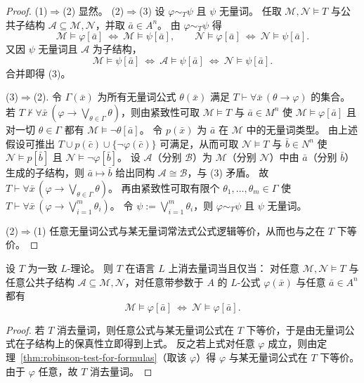 \documentclass[lang=cn,a4paper,newtx,section]{elegantbook}
\begin{document}
\begin{proof}
(1)$\Rightarrow$(2) 显然。
(2)$\Rightarrow$(3) 设 $\varphi\sim_T\psi$ 且 $\psi$ 无量词。
任取 $\mathcal M,\mathcal N\models T$ 与公共子结构 $\mathcal A\subseteq\mathcal M,\mathcal N$，并取 $\bar a\in A^n$。
由 $\varphi\sim_T\psi$ 得
\[
  \mathcal M\models\varphi[\bar a]\ \Longleftrightarrow\ \mathcal M\models\psi[\bar a],
  \qquad
  \mathcal N\models\varphi[\bar a]\ \Longleftrightarrow\ \mathcal N\models\psi[\bar a].
\]
又因 $\psi$ 无量词且 $\mathcal A$ 为子结构，
\[
  \mathcal M\models\psi[\bar a]\ \Longleftrightarrow\ \mathcal A\models\psi[\bar a]\ \Longleftrightarrow\ \mathcal N\models\psi[\bar a].
\]
合并即得 (3)。

(3)$\Rightarrow$(2).
令 $\Gamma(\bar x)$ 为所有无量词公式 $\theta(\bar x)$ 满足 $T\vdash\forall\bar x\,(\theta\to\varphi)$ 的集合。
若 $T\not\vdash\forall\bar x\,(\varphi\to\bigvee_{\theta\in\Gamma}\theta)$，则由紧致性可取 $\mathcal M\models T$ 与 $\bar a\in M^n$ 使
$\mathcal M\models\varphi[\bar a]$ 且对一切 $\theta\in\Gamma$ 都有 $\mathcal M\models\neg\theta[\bar a]$。
令 $p(\bar x)$ 为 $\bar a$ 在 $\mathcal M$ 中的无量词类型。
由上述假设可推出 $T\cup p(\bar c)\cup\{\neg\varphi(\bar c)\}$ 可满足，从而可取 $\mathcal N\models T$ 与 $\bar b\in N^n$ 使 $\mathcal N\models p[\bar b]$ 且 $\mathcal N\models\neg\varphi[\bar b]$。
设 $\mathcal A$（分别 $\mathcal B$）为 $\mathcal M$（分别 $\mathcal N$）中由 $\bar a$（分别 $\bar b$）生成的子结构，则 $\bar a\mapsto\bar b$ 给出同构 $\mathcal A\cong\mathcal B$，与 (3) 矛盾。
故 $T\vdash\forall\bar x\,(\varphi\to\bigvee_{\theta\in\Gamma}\theta)$。
再由紧致性可取有限个 $\theta_1,\dots,\theta_m\in\Gamma$ 使 $T\vdash\forall\bar x\,(\varphi\to\bigvee_{i=1}^m\theta_i)$。
令 $\psi:=\bigvee_{i=1}^m\theta_i$，则 $\varphi\sim_T\psi$ 且 $\psi$ 无量词。

(2)$\Rightarrow$(1) 任意无量词公式与某无量词常法式公式逻辑等价，从而也与之在 $T$ 下等价。
\end{proof}

\begin{theorem}
\label{symmetric-robinson-test}
设 $T$ 为一致 $L$-理论。
则 $T$ 在语言 $L$ 上消去量词当且仅当：
对任意 $\mathcal M,\mathcal N\models T$ 与任意公共子结构 $\mathcal A\subseteq\mathcal M,\mathcal N$，对任意带参数于 $A$ 的 $L$-公式 $\varphi(\bar x)$ 与任意 $\bar a\in A^n$ 都有
\[
  \mathcal M\models\varphi[\bar a]\ \Longleftrightarrow\ \mathcal N\models\varphi[\bar a].
\]
\end{theorem}

\begin{proof}
若 $T$ 消去量词，则任意公式与某无量词公式在 $T$ 下等价，于是由无量词公式在子结构上的保真性立即得到上式。
反之若上式对任意 $\varphi$ 成立，则由定理~\ref{thm:robinson-test-for-formulas}（取该 $\varphi$）得 $\varphi$ 与某无量词公式在 $T$ 下等价。
由于 $\varphi$ 任意，故 $T$ 消去量词。
\end{proof}
\end{document}
